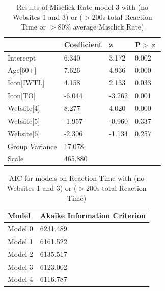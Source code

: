 \documentclass[12pt,twoside]{reedthesis}
\begin{document}
\begin{table}[h!]
        \centering
        \begin{tabular}{| p{5cm} | p{2.5cm} | p{2.5cm} | p{2.5cm} |}
            \hline
            & Coefficient & z & P$>|\text{z}|$\\
            \hline
            Intercept & 6.340 & 3.172 & 0.002\\
            \hline
            Age[60+] & 7.626 & 4.936 & 0.000\\
            \hline
            Icon[IWTL] & 4.158 & 2.133 & 0.033\\
            \hline
            Icon[TO] & -6.044 & -3.262 & 0.001\\
            \hline
            Website[4] & 8.277 & 4.020 & 0.000\\
            \hline
            Website[5] & -1.957 & -0.960 & 0.337\\
            \hline
            Website[6] & -2.306 & -1.134 & 0.257\\
            \hline
            Group Variance & 17.078 &&\\
            \hline
            Scale & 465.880 &&\\
            \hline
        \end{tabular}
        \caption{Results of Misclick Rate model 3 with (no Websites 1 and 3) or ($>200$s total Reaction Time or $>80$\% average Misclick Rate)}
    \end{table}

\begin{table}[h!]
        \centering
        \begin{tabular}{| p{3.5cm} | p{7.5cm} |}
            \hline
            Model & Akaike Information Criterion\\
            \hline
            Model 0 & 6231.489\\
            \hline
            Model 1 & 6161.522\\
            \hline
            Model 2 & 6135.517\\
            \hline
            Model 3 & 6123.002\\
            \hline
            Model 4 & 6116.787\\
            \hline
        \end{tabular}
        \caption{AIC for models on Reaction Time with (no Websites 1 and 3) or ($>200$s total Reaction Time)}
    \end{table}
\end{document}
